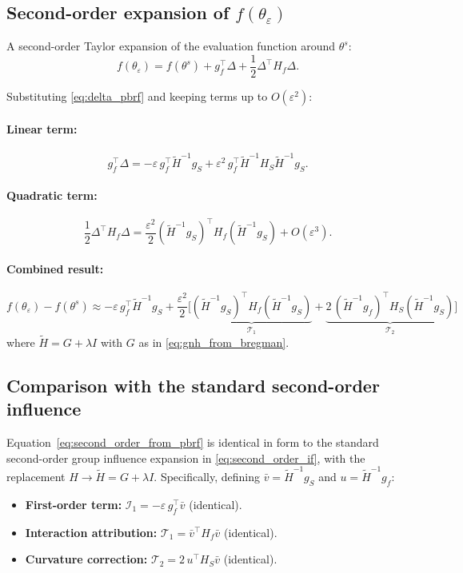 \documentclass{article}
\theoremstyle{plain}
\theoremstyle{definition}
\theoremstyle{remark}
\begin{document}
\subsection{Second-order expansion of $f(\theta_\varepsilon)$}

A second-order Taylor expansion of the evaluation function around $\theta^s$:
\[
f(\theta_\varepsilon) = f(\theta^s) + g_f^\top \Delta + \frac{1}{2}\Delta^\top H_f \Delta.
\]

Substituting \eqref{eq:delta_pbrf} and keeping terms up to $O(\varepsilon^2)$:

\paragraph{Linear term:}
\[
g_f^\top \Delta = -\varepsilon\, g_f^\top \tilde{H}^{-1} g_S
+ \varepsilon^2\, g_f^\top \tilde{H}^{-1} H_S \tilde{H}^{-1} g_S.
\]

\paragraph{Quadratic term:}
\[
\frac{1}{2}\Delta^\top H_f \Delta
= \frac{\varepsilon^2}{2}(\tilde{H}^{-1} g_S)^\top H_f (\tilde{H}^{-1} g_S) + O(\varepsilon^3).
\]

\paragraph{Combined result:}
\begin{equation}
\boxed{
f(\theta_\varepsilon) - f(\theta^s)
\approx
-\varepsilon\, g_f^\top \tilde{H}^{-1} g_S
+ \frac{\varepsilon^2}{2}\Big[
\underbrace{(\tilde{H}^{-1}g_S)^\top H_f (\tilde{H}^{-1}g_S)}_{\mathcal{T}_1}
+ \underbrace{2\,(\tilde{H}^{-1}g_f)^\top H_S (\tilde{H}^{-1}g_S)}_{\mathcal{T}_2}
\Big]
}
\label{eq:second_order_from_pbrf}
\end{equation}
where $\tilde{H} = G + \lambda I$ with $G$ as in \eqref{eq:gnh_from_bregman}.

\subsection{Comparison with the standard second-order influence}

Equation~\eqref{eq:second_order_from_pbrf} is identical in form to the standard second-order
group influence expansion in \cref{eq:second_order_if}, with the replacement
$H \to \tilde{H} = G + \lambda I$.
Specifically, defining $\bar{v} = \tilde{H}^{-1}g_S$ and $u = \tilde{H}^{-1}g_f$:
\begin{itemize}
\item \textbf{First-order term:} $\mathcal{I}_1 = -\varepsilon\, g_f^\top \bar{v}$ (identical).
\item \textbf{Interaction attribution:} $\mathcal{T}_1 = \bar{v}^\top H_f \bar{v}$ (identical).
\item \textbf{Curvature correction:} $\mathcal{T}_2 = 2\,u^\top H_S \bar{v}$ (identical).
\end{itemize}
\end{document}
